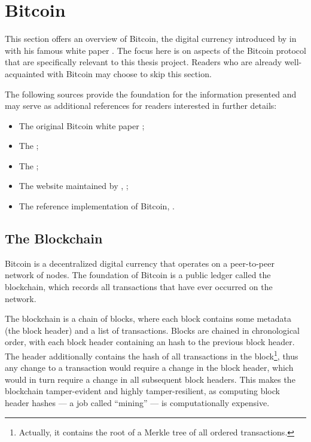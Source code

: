 \section{Bitcoin}\label{sec:bitcoin}

This section offers an overview of Bitcoin, the digital currency
introduced by \citeauthor{whitepaper} in \citeyear{whitepaper} with his famous
white paper \cite{whitepaper}. The focus here is on aspects of the Bitcoin
protocol that are specifically relevant to this thesis project. Readers who are
already well-acquainted with Bitcoin may choose to skip this section.

The following sources provide the foundation for the information presented and
may serve as additional references for readers interested in further details:
\begin{itemize}
	\item The original Bitcoin white paper \cite{whitepaper};
	\item The  \cite{bitcoin-wiki};
	\item The  \cite{bitcoin-dev};
	\item The website maintained by \citeauthor{learnmeabitcoin},
		 \cite{learnmeabitcoin};
	\item The reference implementation of Bitcoin, 
		\cite{bitcoin-core}.
\end{itemize}

\subsection{The Blockchain}\label{subsec:blockchain}

Bitcoin is a decentralized digital currency that operates on a peer-to-peer
network of nodes. The foundation of Bitcoin is a public ledger called the
blockchain, which records all transactions that have ever occurred on the
network.

The blockchain is a chain of blocks, where each block contains some metadata
(the block header) and a list of transactions. Blocks are chained in
chronological order, with each block header containing an hash to the previous
block header. The header additionally contains the hash of all transactions in
the block\footnote{Actually, it contains the root of a Merkle tree of all
ordered transactions.}, thus any change to a transaction would require a change
in the block header, which would in turn require a change in all subsequent
block headers. This makes the blockchain tamper-evident and highly
tamper-resilient, as computing block header hashes --- a job called ``mining''
--- is computationally expensive.

